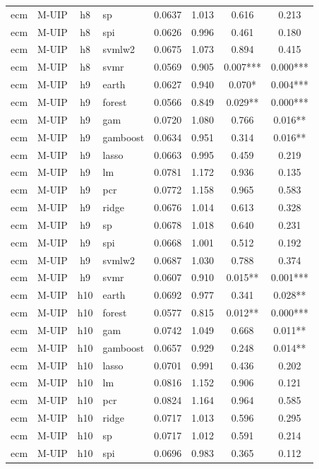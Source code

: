 \begin{ThreePartTable}
\begin{longtable}[t]{llclcccc}
ecm & M-UIP & h8 & sp & 0.0637 & 1.013 & 0.616 & 0.213\\
ecm & M-UIP & h8 & spi & 0.0626 & 0.996 & 0.461 & 0.180\\
ecm & M-UIP & h8 & svmlw2 & 0.0675 & 1.073 & 0.894 & 0.415\\
ecm & M-UIP & h8 & svmr & 0.0569 & 0.905 & 0.007*** & 0.000***\\
\addlinespace
ecm & M-UIP & h9 & earth & 0.0627 & 0.940 & 0.070* & 0.004***\\
ecm & M-UIP & h9 & forest & 0.0566 & 0.849 & 0.029** & 0.000***\\
ecm & M-UIP & h9 & gam & 0.0720 & 1.080 & 0.766 & 0.016**\\
ecm & M-UIP & h9 & gamboost & 0.0634 & 0.951 & 0.314 & 0.016**\\
ecm & M-UIP & h9 & lasso & 0.0663 & 0.995 & 0.459 & 0.219\\
ecm & M-UIP & h9 & lm & 0.0781 & 1.172 & 0.936 & 0.135\\
ecm & M-UIP & h9 & pcr & 0.0772 & 1.158 & 0.965 & 0.583\\
ecm & M-UIP & h9 & ridge & 0.0676 & 1.014 & 0.613 & 0.328\\
ecm & M-UIP & h9 & sp & 0.0678 & 1.018 & 0.640 & 0.231\\
ecm & M-UIP & h9 & spi & 0.0668 & 1.001 & 0.512 & 0.192\\
ecm & M-UIP & h9 & svmlw2 & 0.0687 & 1.030 & 0.788 & 0.374\\
ecm & M-UIP & h9 & svmr & 0.0607 & 0.910 & 0.015** & 0.001***\\
\addlinespace
ecm & M-UIP & h10 & earth & 0.0692 & 0.977 & 0.341 & 0.028**\\
ecm & M-UIP & h10 & forest & 0.0577 & 0.815 & 0.012** & 0.000***\\
ecm & M-UIP & h10 & gam & 0.0742 & 1.049 & 0.668 & 0.011**\\
ecm & M-UIP & h10 & gamboost & 0.0657 & 0.929 & 0.248 & 0.014**\\
ecm & M-UIP & h10 & lasso & 0.0701 & 0.991 & 0.436 & 0.202\\
ecm & M-UIP & h10 & lm & 0.0816 & 1.152 & 0.906 & 0.121\\
ecm & M-UIP & h10 & pcr & 0.0824 & 1.164 & 0.964 & 0.585\\
ecm & M-UIP & h10 & ridge & 0.0717 & 1.013 & 0.596 & 0.295\\
ecm & M-UIP & h10 & sp & 0.0717 & 1.012 & 0.591 & 0.214\\
ecm & M-UIP & h10 & spi & 0.0696 & 0.983 & 0.365 & 0.112\\

\end{longtable}
\end{ThreePartTable}
